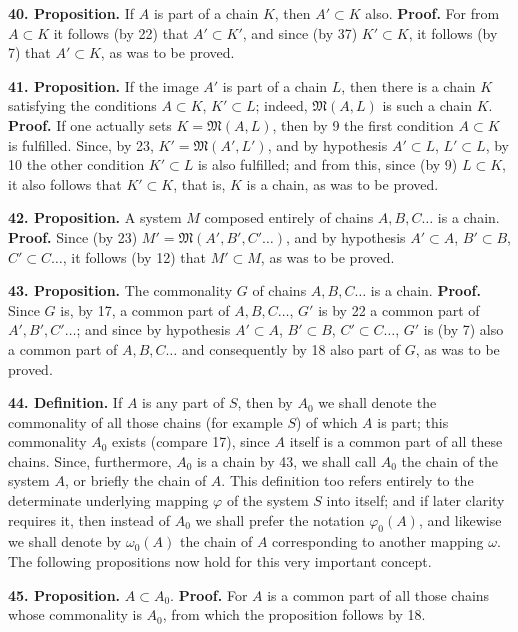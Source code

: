 \documentclass[11pt]{article}
\newcommand{\Mf}{\mathfrak{M}}
\newcommand{\partof}{\mathrel{\subset}}
\begin{document}
\noindent\textbf{40. Proposition.} If $A$ is part of a chain $K$, then $A'\partof K$ also. \textbf{Proof.} For from $A\partof K$ it follows (by 22) that $A'\partof K'$, and since (by 37) $K'\partof K$, it follows (by 7) that $A'\partof K$, as was to be proved.

\noindent\textbf{41. Proposition.} If the image $A'$ is part of a chain $L$, then there is a chain $K$ satisfying the conditions $A\partof K$, $K'\partof L$; indeed, $\Mf(A,L)$ is such a chain $K$. \textbf{Proof.} If one actually sets $K=\Mf(A,L)$, then by 9 the first condition $A\partof K$ is fulfilled. Since, by 23, $K'=\Mf(A',L')$, and by hypothesis $A'\partof L$, $L'\partof L$, by 10 the other condition $K'\partof L$ is also fulfilled; and from this, since (by 9) $L\partof K$, it also follows that $K'\partof K$, that is, $K$ is a chain, as was to be proved.

\noindent\textbf{42. Proposition.} A system $M$ composed entirely of chains $A,B,C\ldots$ is a chain. \textbf{Proof.} Since (by 23) $M'=\Mf(A',B',C'\ldots)$, and by hypothesis $A'\partof A$, $B'\partof B$, $C'\partof C\ldots$, it follows (by 12) that $M'\partof M$, as was to be proved.

\noindent\textbf{43. Proposition.} The commonality $G$ of chains $A,B,C\ldots$ is a chain. \textbf{Proof.} Since $G$ is, by 17, a common part of $A,B,C\ldots$, $G'$ is by 22 a common part of $A',B',C'\ldots$; and since by hypothesis $A'\partof A$, $B'\partof B$, $C'\partof C\ldots$, $G'$ is (by 7) also a common part of $A,B,C\ldots$ and consequently by 18 also part of $G$, as was to be proved.

\noindent\textbf{44. Definition.} If $A$ is any part of $S$, then by $A_0$ we shall denote the commonality of all those chains (for example $S$) of which $A$ is part; this commonality $A_0$ exists (compare 17), since $A$ itself is a common part of all these chains. Since, furthermore, $A_0$ is a chain by 43, we shall call $A_0$ the chain of the system $A$, or briefly the chain of $A$. This definition too refers entirely to the determinate underlying mapping $\varphi$ of the system $S$ into itself; and if later clarity requires it, then instead of $A_0$ we shall prefer the notation $\varphi_0(A)$, and likewise we shall denote by $\omega_0(A)$ the chain of $A$ corresponding to another mapping $\omega$. The following propositions now hold for this very important concept.

\noindent\textbf{45. Proposition.} $A\partof A_0$. \textbf{Proof.} For $A$ is a common part of all those chains whose commonality is $A_0$, from which the proposition follows by 18.
\end{document}
